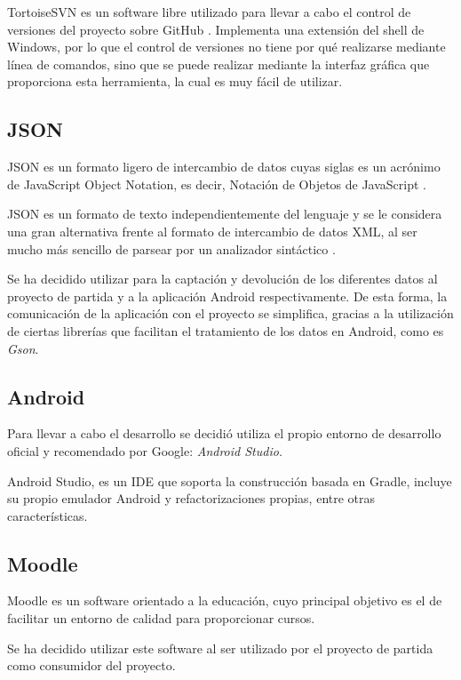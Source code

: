 TortoiseSVN es un software libre utilizado para llevar a cabo el control de versiones del proyecto sobre GitHub \cite{wiki:tortoisesvn}. Implementa una extensión del shell de Windows, por lo que el control de versiones no tiene por qué realizarse mediante línea de comandos, sino que se puede realizar mediante la interfaz gráfica que proporciona esta herramienta, la cual es muy fácil de utilizar.

\subsection{JSON}\label{json}

JSON es un formato ligero de intercambio de datos cuyas siglas es un acrónimo de JavaScript Object Notation, es decir, Notación de Objetos de JavaScript \cite{wiki:json}. 

JSON es un formato de texto independientemente del lenguaje y se le considera una gran alternativa frente al formato de intercambio de datos XML, al ser mucho más sencillo de parsear por un analizador sintáctico \cite{wiki:json2}.

Se ha decidido utilizar para la captación y devolución de los diferentes datos al proyecto de partida y a la aplicación Android respectivamente. De esta forma, la comunicación de la aplicación
con el proyecto se simplifica, gracias a la utilización de ciertas librerías que facilitan el tratamiento de los datos en Android, como es \emph{Gson}.

\subsection{Android}

Para llevar a cabo el desarrollo se decidió utiliza el propio entorno de desarrollo oficial y recomendado por Google: \emph{Android Studio.}

Android Studio, es un IDE que soporta la construcción basada en Gradle, incluye su propio emulador Android y refactorizaciones propias, entre otras características.

\subsection{Moodle}

Moodle es un software orientado a la educación, cuyo principal objetivo es el de facilitar un entorno de calidad para proporcionar cursos. \cite{wiki:moodle}

Se ha decidido utilizar este software al ser utilizado por el proyecto de partida como consumidor del proyecto.


